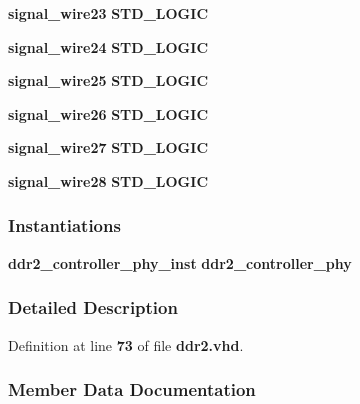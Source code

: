 \begin{DoxyCompactItemize}
\item 
{\bf signal\+\_\+wire23} {\bfseries \textcolor{comment}{S\+T\+D\+\_\+\+L\+O\+G\+IC}\textcolor{vhdlchar}{ }} 
\item 
{\bf signal\+\_\+wire24} {\bfseries \textcolor{comment}{S\+T\+D\+\_\+\+L\+O\+G\+IC}\textcolor{vhdlchar}{ }} 
\item 
{\bf signal\+\_\+wire25} {\bfseries \textcolor{comment}{S\+T\+D\+\_\+\+L\+O\+G\+IC}\textcolor{vhdlchar}{ }} 
\item 
{\bf signal\+\_\+wire26} {\bfseries \textcolor{comment}{S\+T\+D\+\_\+\+L\+O\+G\+IC}\textcolor{vhdlchar}{ }} 
\item 
{\bf signal\+\_\+wire27} {\bfseries \textcolor{comment}{S\+T\+D\+\_\+\+L\+O\+G\+IC}\textcolor{vhdlchar}{ }} 
\item 
{\bf signal\+\_\+wire28} {\bfseries \textcolor{comment}{S\+T\+D\+\_\+\+L\+O\+G\+IC}\textcolor{vhdlchar}{ }} 
\end{DoxyCompactItemize}
\subsubsection*{Instantiations}
 \begin{DoxyCompactItemize}
\item 
{\bf ddr2\+\_\+controller\+\_\+phy\+\_\+inst}  {\bfseries ddr2\+\_\+controller\+\_\+phy}   
\end{DoxyCompactItemize}


\subsubsection{Detailed Description}


Definition at line {\bf 73} of file {\bf ddr2.\+vhd}.



\subsubsection{Member Data Documentation}
\paragraph[{ddr2\+\_\+controller\+\_\+phy}]{ {\bfseries \textcolor{vhdlchar}{ }} \hspace{0.3cm}{\ttfamily [Component]}}\label{classddr2_1_1SYN_a1897710ce934daa760d3c37e3df6a573}


